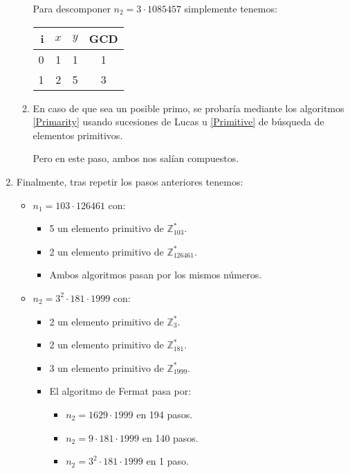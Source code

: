 \begin{enumerate}
\begin{enumerate}
			Para descomponer $n_2 = 3 \cdot 1085457$ simplemente tenemos:
			\begin{center}
			\begin{tabular}{ | r | c | c | c |}
				\hline
				i   & $x$       & $y$       & GCD \\
				\hline
				0   & 1         & 1         & 1 \\
				1   & 2         & 5         & 3 \\
				\hline
			\end{tabular}
			\end{center}

			\item En caso de que sea un posible primo, se probaría mediante los algoritmos \ref{Primarity} usando
			sucesiones de Lucas u \ref{Primitive} de búsqueda de elementos primitivos.
			
			Pero en este paso, ambos nos salían compuestos.
		\end{enumerate}
		
		\item Finalmente, tras repetir los pasos anteriores tenemos:
		\begin{itemize}
			\item $n_1 = 103 \cdot 126461$ con:
			\begin{itemize}
				\item 5 un elemento primitivo de $\mathbb{Z}^*_{103}$.
				\item 2 un elemento primitivo de $\mathbb{Z}^*_{126461}$.
				\item Ambos algoritmos pasan por los mismos números.
			\end{itemize}
			
			\item $n_2 = 3^2 \cdot 181 \cdot 1999$ con:
			\begin{itemize}
				\item 2 un elemento primitivo de $\mathbb{Z}^*_{3}$.
				\item 2 un elemento primitivo de $\mathbb{Z}^*_{181}$.
				\item 3 un elemento primitivo de $\mathbb{Z}^*_{1999}$.
				\item El algoritmo de Fermat pasa por:
				\begin{itemize}
					\item $n_2 = 1629 \cdot 1999$ en 194 pasos.
					\item $n_2 = 9 \cdot 181 \cdot 1999$ en 140 pasos.
					\item $n_2 = 3^2 \cdot 181 \cdot 1999$ en 1 paso.
				\end{itemize}
				

\end{itemize}
\end{itemize}
\end{enumerate}
